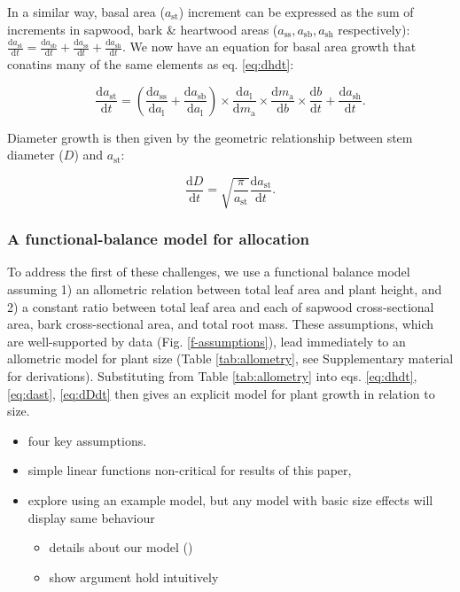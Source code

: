 \documentclass[12pt, a4paper]{article}
\begin{document}
In a similar way, basal area ($a_\textrm{st}$) increment can be
expressed as the sum of increments in sapwood, bark \& heartwood areas
($a_\textrm{ss}, a_\textrm{sb}, a_\textrm{sh}$ respectively):
$\frac{\textrm{d}a_\textrm{st}}{\textrm{d}t}= \frac{\textrm{d}a_\textrm{sb}}{\textrm{d}t} + \frac{\textrm{d}a_\textrm{ss}}{\textrm{d}t} + \frac{\textrm{d}a_\textrm{sh}}{\textrm{d}t}$.
We now have an equation for basal area growth that conatins many of the same
elements as eq. \ref{eq:dhdt}:

\begin{equation}\label{eq:dast}
\frac{\textrm{d}a_\textrm{st}}{\textrm{d}t}=
\left(\frac{\textrm{d}a_\textrm{ss}}{\textrm{d}a_\textrm{l}} + \frac{\textrm{d}a_\textrm{sb}}{\textrm{d}a_\textrm{l}}\right) \times
\frac{\textrm{d}a_\textrm{l}}{\textrm{d}m_\textrm{a}} \times \frac{\textrm{d}m_\textrm{a}}{\textrm{d}b} \times \frac{\textrm{d}b}{\textrm{d}t} +\frac{\textrm{d}a_\textrm{sh}}{\textrm{d}t} .
\end{equation}

Diameter growth is then given by the geometric relationship between stem
diameter ($D$) and $a_\textrm{st}$:

\begin{equation} \label{eq:dDdt}
\frac{\textrm{d}D}{\textrm{d}t}= \sqrt{\frac{\pi}{a_\textrm{st}}} \frac{\textrm{d}a_\textrm{st}}{\textrm{d}t}.
\end{equation}

\subsubsection{A functional-balance model for allocation}

To address the first of these challenges, we use a functional balance
model \citep{yokozawa-1995,falster-2011} assuming
1) an allometric relation between total leaf area and plant height, and
2) a constant ratio between total leaf area and each of sapwood
cross-sectional area, bark cross-sectional area, and total root mass.
These assumptions, which are well-supported by data (Fig.
\ref{f-assumptions}), lead immediately to an allometric model for plant
size (Table \ref{tab:allometry}, see Supplementary material for
derivations). Substituting from Table \ref{tab:allometry} into eqs.
\ref{eq:dhdt}, \ref{eq:dast}, \ref{eq:dDdt} then gives an explicit model
for plant growth in relation to size.


\begin{itemize}
\itemsep1pt\parskip0pt
\item
  four key assumptions.
\item
  simple linear functions non-critical for results of this paper,
\item
  explore using an example model, but any model with basic size effects
  will display same behaviour

  \begin{itemize}
  \itemsep1pt\parskip0pt
  \item
    details about our model ()
  \item
    show argument hold intuitively
  \end{itemize}
\end{itemize}
\end{document}
